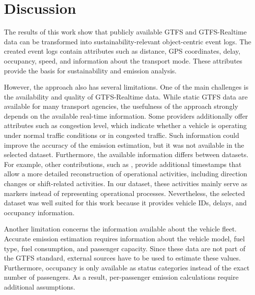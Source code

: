 \chapter{Discussion}
\label{chap:discussion}

The results of this work show that publicly available GTFS and GTFS-Realtime data can be transformed into sustainability-relevant object-centric event logs. The created event logs contain attributes such as distance, GPS coordinates, delay, occupancy, speed, and information about the transport mode. These attributes provide the basis for sustainability and emission analysis.

However, the approach also has several limitations. One of the main challenges is the availability and quality of GTFS-Realtime data. While static GTFS data are available for many transport agencies, the usefulness of the approach strongly depends on the available real-time information. Some providers additionally offer attributes such as congestion level, which indicate whether a vehicle is operating under normal traffic conditions or in congested traffic. Such information could improve the accuracy of the emission estimation, but it was not available in the selected dataset. Furthermore, the available information differs between datasets. For example, other contributions, such as \cite{data10080119}, provide additional timestamps that allow a more detailed reconstruction of operational activities, including direction changes or shift-related activities. In our dataset, these activities mainly serve as markers instead of representing operational processes. Nevertheless, the selected dataset was well suited for this work because it provides vehicle IDs, delays, and occupancy information.

Another limitation concerns the information available about the vehicle fleet. Accurate emission estimation requires information about the vehicle model, fuel type, fuel consumption, and passenger capacity. Since these data are not part of the GTFS standard, external sources have to be used to estimate these values. Furthermore, occupancy is only available as status categories instead of the exact number of passengers. As a result, per-passenger emission calculations require additional assumptions.

